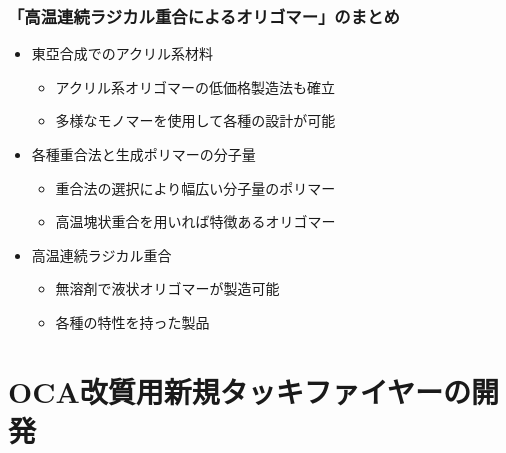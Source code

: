 \documentclass[12pt, dvipdfmx]{beamer}
\begin{document}
\begin{frame}
	\frametitle{「高温連続ラジカル重合によるオリゴマー」のまとめ}
        \begin{boxnote}
            \vspace{-3mm}
            \begin{itemize}
                \item 東亞合成でのアクリル系材料
                    \begin{itemize}
                        \item アクリル系オリゴマーの低価格製造法も確立
                        \item 多様なモノマーを使用して各種の設計が可能
                    \end{itemize} 
                \item 各種重合法と生成ポリマーの分子量
                    \begin{itemize}
                        \item 重合法の選択により幅広い分子量のポリマー
                        \item 高温塊状重合を用いれば特徴あるオリゴマー
                    \end{itemize} 
                \item 高温連続ラジカル重合
                    \begin{itemize}
                        \item 無溶剤で液状オリゴマーが製造可能
                        \item 各種の特性を持った製品
                    \end{itemize}
            \end{itemize}
        \end{boxnote}
\end{frame}





\section{OCA改質用新規タッキファイヤーの開発}
\end{document}
